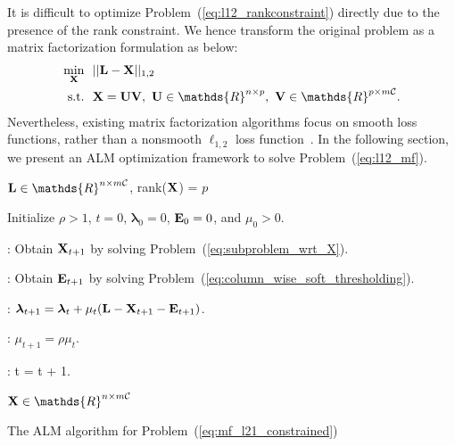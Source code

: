\documentclass[letterpaper]{article}
\def\bE{{\bf E}}
\def\blambda{{\bm \lambda}}
\def\calC{{\mathcal{C}}}
\def\bL{{\bf L}}
\def\bU{{\bf U}}
\def\bV{{\bf V}}
\def\dsR{\mathds{R}}
\def\bX{{\bf X}}
\def\bX{{\bf X}}
\def\st{{\text{s.t.}}}
\begin{document}
It is difficult to optimize Problem~(\ref{eq:l12_rankconstraint}) directly due to the presence of the rank constraint.
We hence transform the original problem as a matrix factorization formulation as below:
{\small
\begin{align}\label{eq:l12_mf}
  \min_{\bX} ~&~ || \bL - \bX ||_{1,2}   \nonumber \\
         \st ~&~ \bX = \bU \bV,~\bU \in \dsR^{n \times p},~\bV \in \dsR^{p \times m\calC}  .
\end{align}
}
\noindent
Nevertheless, existing matrix factorization algorithms focus on smooth loss functions, rather than a nonsmooth $\ell_{1,2}$ loss function~\cite{tanicml2014riemannian,vandereycken2013lowrank,Wen2012,ngonips2012scaled,rtrmc2011boumal}.
In the following section, we present an ALM optimization framework to solve Problem~(\ref{eq:l12_mf}).


\begin{algorithm}[ht]

\begin{algorithmic}

\REQUIRE $\bL \in \dsR^{n \times m\calC}$, rank($\bX$) = $p$

\STATE Initialize $\rho > 1$, $t = 0$, $\blambda_{0} = 0$, $\bE_{0} = 0$, and $\mu_{0} > 0$.



    : Obtain $\bX_{t+1}$ by solving Problem~(\ref{eq:subproblem_wrt_X}).

    : Obtain $\bE_{t+1}$ by solving Problem~(\ref{eq:column_wise_soft_thresholding}).

  \ENDWHILE

  : $\blambda_{t+1} = \blambda_{t} + \mu_{t} (\bL - \bX_{t+1} - \bE_{t+1})$.

  : $\mu_{t+1} = \rho \mu_{t}$.

  : t = t + 1.

\ENDWHILE

\ENSURE $\bX \in \dsR^{n \times m\calC}$

\end{algorithmic}
\caption{The ALM algorithm for Problem~(\ref{eq:mf_l21_constrained})}
\label{alg:alm_mf}
\end{algorithm}
\end{document}
